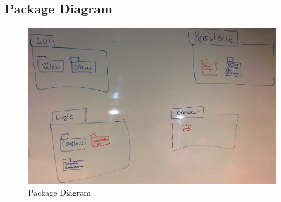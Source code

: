 \subsection{Package Diagram}
\begin{figure}[H]
  \includegraphics[width=\textwidth,natwidth=2631,natheight=1660]{illustrations/PackageDiagram.jpg}
  \caption{Package Diagram}
  \label{packagediagram}
\end{figure}
